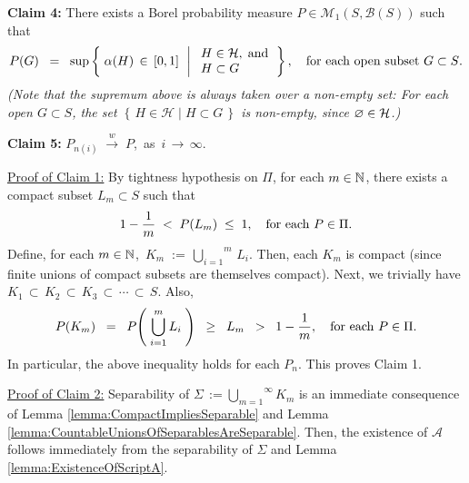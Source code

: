 \vskip 0.5cm
\begin{center}
\begin{minipage}{6.5in}
\textbf{Claim 4:}\quad
There exists a Borel probability measure $P \in \mathcal{M}_{1}(S,\mathcal{B}(S))$ such that
\begin{equation*}
P(G)
\;\; = \;\;
\sup\left\{\;
\alpha(H) \,\in\, [0,1]
\,\;\left\vert\;
\begin{array}{l} H \in \mathcal{H}, \;\textnormal{and} \\ H \subset G \end{array}
\right.
\right\},
\quad
\textnormal{for each open subset $G \subset S$}.
\end{equation*}
\textit{\small(Note that the supremum above is always taken over a non-empty set: For each open $G \subset S$,
the set $\left\{\,H \in \mathcal{H}\;\vert\;H \subset G\,\right\}$ is non-empty, since $\varnothing \in \mathcal{H}$.)}
\end{minipage}
\end{center}

\vskip 0.5cm
\begin{center}
\begin{minipage}{6.5in}
\textbf{Claim 5:}\quad
$P_{n(i)} \;\overset{w}{\longrightarrow}\; P$,\,
as \,$i\,\longrightarrow\,\infty$.
\end{minipage}
\end{center}

\vskip 0.5cm
\noindent
\underline{Proof of Claim 1:}\quad
By tightness hypothesis on $\Pi$,
for each $m \in \mathbb{N}$,
there exists a compact subset $L_{m} \subset S$ such that
\begin{equation*}
1 - \dfrac{1}{m} \; < \; P(L_{m}) \; \leq \; 1,
\quad
\textnormal{for each $P \in \Pi$}.
\end{equation*}
Define, for each $m \in \mathbb{N}$,
\,$K_{m} \; := \, \overset{m}{\underset{i=1}{\bigcup}}\,L_{i}$.
Then, each $K_{m}$ is compact (since finite unions of compact subsets are themselves compact).
Next, we trivially have\;
$K_{1} \,\subset\, K_{2} \,\subset\, K_{3} \,\subset\, \cdots \,\subset\, S$.
Also,
\begin{equation*}
P(K_{m})
\;\;=\;\; P\!\left(\;\bigcup_{i=1}^{m}L_{i}\;\right)
\;\;\geq\;\; L_{m}
\;\; > \;\; 1 - \dfrac{1}{m},
\quad
\textnormal{for each $P \in \Pi$}.
\end{equation*}
In particular, the above inequality holds for each $P_{n}$. This proves Claim 1.


\vskip 0.5cm
\noindent
\underline{Proof of Claim 2:}\quad
Separability of $\Sigma \,:= \overset{\infty}{\underset{m=1}{\bigcup}}K_{m}$
is an immediate consequence of
Lemma \ref{lemma:CompactImpliesSeparable} and
Lemma \ref{lemma:CountableUnionsOfSeparablesAreSeparable}.
Then, the existence of $\mathcal{A}$ follows immediately
from the separability of $\Sigma$
and Lemma \ref{lemma:ExistenceOfScriptA}.

